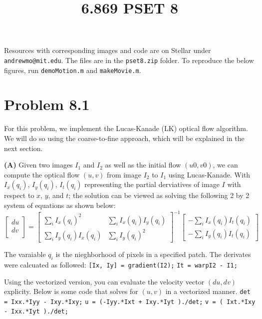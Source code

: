 \documentclass[12pt,twoside]{article}
\title{6.869 PSET 8}
\newcommand{\theproblemsetnum}{8}
\newcommand{\tabUnit}{3ex}
\newcommand{\tabT}{\hspace*{\tabUnit}}
\begin{document}
\handout{Problem Set \theproblemsetnum}{Nov 20, 2014 (1:00pm)}
\tabT Resources with corresponding images and code are on Stellar under \texttt{andrewmo@mit.edu}.  The files are in the \texttt{pset8.zip} folder.  To reproduce the below figures, run \texttt{demoMotion.m} and \texttt{makeMovie.m}.


\section*{Problem 8.1}
\tabT For this problem, we implement the Lucas-Kanade (LK) optical flow algorithm.  We will do so using the coarse-to-fine approach, which will be explained in the next section.
\newline

\textbf{(A)} Given two images $I_1$ and $I_2$ as well as the initial flow $(u0,v0)$, we can compute the optical flow $(u,v)$ from image $I_2$ to $I_1$ using Lucas-Kanade.  With $I_{x}(q_{i})$, $I_{y}(q_{i})$, $I_{t}(q_{i})$ representing the partial derviatives of image $I$ with respect to $x$, $y$, and $t$; the solution can be viewed as solving the following 2 by 2 system of equations as shown below:
\newline
$$
\begin{bmatrix}
du \\[0.3em]
dv \\[0.3em]
\end{bmatrix}
=
\begin{bmatrix}
\sum\limits_{i} I_{x}(q_{i})^{2}  &  \sum\limits_{i} I_{x}(q_{i})I_{y}(q_{i})\\[0.3em]
\sum\limits_{i} I_{y}(q_{i})I_{x}(q_{i})  &  \sum\limits_{i} I_{y}(q_{i})^{2}
\end{bmatrix}^{-1}
\begin{bmatrix}
-\sum\limits_{i} I_{x}(q_{i})I_{t}(q_{i}) \\[0.3em]
-\sum\limits_{i} I_{y}(q_{i})I_{t}(q_{i})
\end{bmatrix}
$$

The varaiable $q_{i}$ is the nieghborhood of pixels in a specified patch.  The derivates were calcuated as followed:\newline\newline
\texttt{[Ix, Iy] = gradient(I2);}\newline    
\texttt{It = warpI2 - I1;}\newline

Using the vectorized version, you can evaluate the velocity vector $(du, dv)$ explicity.  Below is some code that solves for $(u,v)$ in a vectorized manner.\newline\newline
\texttt{det = Ixx.*Iyy - Ixy.*Ixy;}\newline
\texttt{u = (-Iyy.*Ixt + Ixy.*Iyt )./det;}\newline
\texttt{v = ( Ixt.*Ixy - Ixx.*Iyt )./det;}\newline
\end{document}

